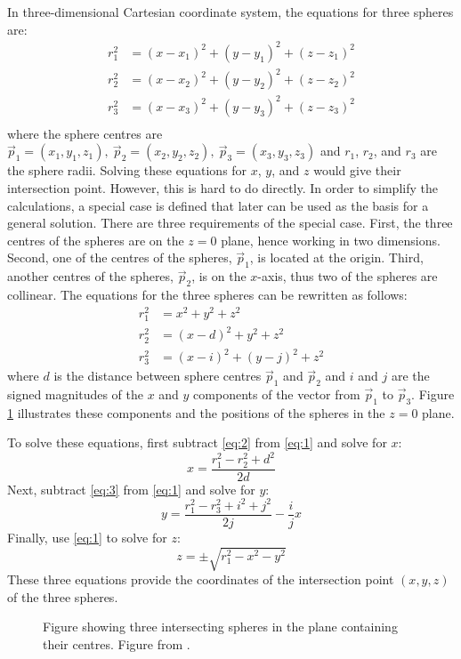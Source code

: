 In three-dimensional Cartesian coordinate system, the equations for three spheres are:
\begin{align*}
	r_1^2 &=(x-x_1)^2+(y-y_1)^2+(z-z_1)^2 \\
	r_2^2 &=(x-x_2)^2+(y-y_2)^2+(z-z_2)^2 \\
	r_3^2 &=(x-x_3)^2+(y-y_3)^2+(z-z_3)^2 \\
\end{align*}
where the sphere centres are $\vec p_1 = (x_1, y_1, z_1), \ \vec p_2 = (x_2, y_2, z_2), \ \vec p_3 = (x_3, y_3, z_3)$ and $r_1$, $r_2$, and $r_3$ are the sphere radii. Solving these equations for $x$, $y$, and $z$ would give their intersection point. However, this is hard to do directly. In order to simplify the calculations, a special case is defined that later can be used as the basis for a general solution. There are three requirements of the special case. First, the three centres of the spheres are on the $z=0$ plane, hence working in two dimensions. Second, one of the centres of the spheres, $\vec p_1$, is located at the origin. Third, another centres of the spheres, $\vec p_2$, is on the $x$-axis, thus two of the spheres are collinear. The equations for the three spheres can be rewritten as follows:
\begin{align}
	r_1^2 & =x^2+y^2+z^2 \label{eq:1}\\
	r_2^2 & =(x-d)^2+y^2+z^2 \label{eq:2}\\
	r_3^2 & =(x-i)^2+(y-j)^2+z^2 \label{eq:3}
\end{align}
where $d$ is the distance between sphere centres $\vec p_1$ and $\vec p_2$ and $i$ and $j$ are the signed magnitudes of the $x$ and $y$ components of the vector from $\vec p_1$ to $\vec p_3$. Figure \ref{fig:trilat2} illustrates these components and the positions of the spheres in the $z=0$ plane.

To solve these equations, first subtract \ref{eq:2} from \ref{eq:1} and solve for $x$:
\[x=\frac{r_1^2-r_2^2+d^2}{2d}\]
Next, subtract \ref{eq:3} from \ref{eq:1} and solve for $y$:
\[y=\frac{r_1^2-r_3^2+i^2+j^2}{2j}-\frac{i}{j}x\]
Finally, use \ref{eq:1} to solve for $z$:
\[z=\pm \sqrt{r_1^2-x^2-y^2}\]
These three equations  provide the coordinates of the intersection point $(x,y,z)$ of the three spheres.

\begin{figure}[h]
	\begin{center}
		\def\svgwidth{0.6\textwidth}
		
		\caption{Figure showing three intersecting spheres in the plane containing their centres. Figure from \cite{Wikipedi2013}.}
		\label{fig:trilat2}
	\end{center}
\end{figure}

